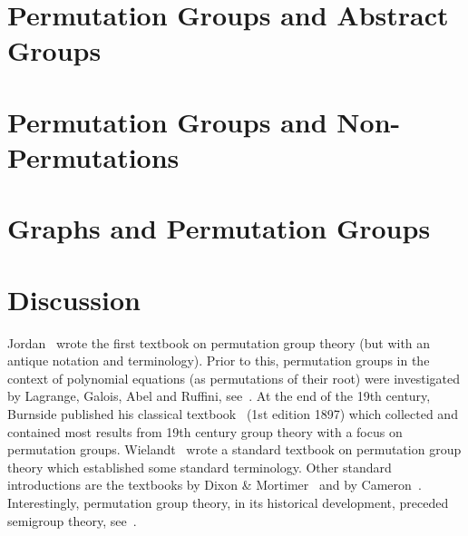 

\section{Permutation Groups and Abstract Groups}
\label{prelim:sec:perm_grp_abstract_grp}



\section{Permutation Groups and Non-Permutations}
\label{prelim:sec:grp-of-units}



\section{Graphs and Permutation Groups}
\label{prelim:sec:graphs-groups}



\section{Discussion}
\label{prelim:permgrp:sec:discussion}

Jordan~\cite{jordan1870} wrote the first textbook on permutation group theory (but with an antique notation and terminology).
Prior to this, permutation groups in the context of polynomial
equations (as permutations of their root)
were investigated by Lagrange, Galois, Abel and Ruffini, see~\cite{Kleiner2007_HistoryAbstractAlgebra,Neumann2011,Wussing1984_GenesisAbstractGroup}.
At the end of the 19th century, Burnside published his classical textbook~\cite{burnside1911} (1st edition 1897) 
which collected and contained most results from 19th century group theory with a focus on permutation groups.
Wielandt~\cite{wielandt1964finite} wrote
a standard textbook on permutation group theory
which established some standard terminology.
Other standard introductions are the textbooks by Dixon \& Mortimer~\cite{dixon1996permutation}
and by Cameron~\cite{cameron_1999}. 
Interestingly, permutation group theory, in its historical development, preceded semigroup theory, 
see~\cite{Hollings2009}.

